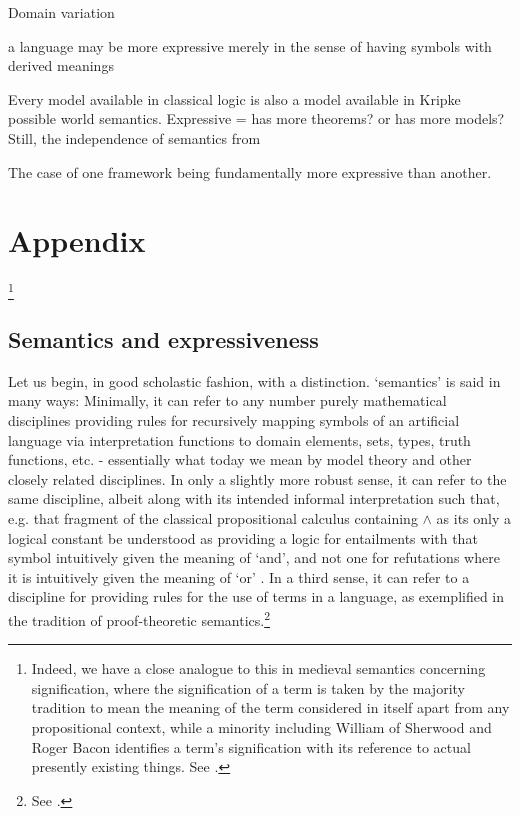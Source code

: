 \documentclass[]{article}
\begin{document}
Domain variation

a language may be more expressive merely in the sense of having symbols with derived meanings 

Every model available in classical logic is also a model available in Kripke possible world semantics.
Expressive = has more theorems? or has more models?
Still, the independence of semantics from 




The case of one framework being fundamentally more expressive than another.
\section{Appendix}
\footnote{
	Indeed, we have a close analogue to this in medieval semantics concerning signification, 
	where the signification of a term is taken by the majority tradition to mean the meaning of the term 
	considered in itself apart from any propositional context, 
	while a minority including William of Sherwood and Roger Bacon identifies a term's signification with its reference to actual presently existing things. 
	See \autocite[170-171]{DeRijk1982}. %
} 
\subsection{Semantics and expressiveness}
Let us begin, in good scholastic fashion, with a distinction.
`semantics' is said in many ways: 
Minimally, it can refer to any number purely mathematical disciplines providing rules for recursively mapping symbols of an artificial language via interpretation functions to domain elements, sets, types, truth functions, etc. - essentially what today we mean by model theory and other closely related disciplines. 
In only a slightly more robust sense, 
it can refer to the same discipline, 
albeit along with its intended informal interpretation such that, 
e.g. that fragment of the classical propositional calculus containing $\wedge$ as its only a logical constant be understood as providing a logic for entailments with that symbol intuitively given the meaning of `and', 
and not one for refutations where it is intuitively given the meaning of `or' .
In a third sense, 
it can refer to a discipline for providing rules for the use of terms in a language, as exemplified in the tradition of proof-theoretic semantics.\footnote{See \autocite{Francez2016b,Read2010,Schroeder-Heister2006}.} 
\end{document}
